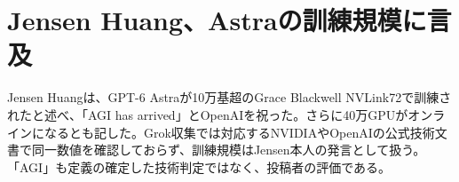 \section{Jensen Huang、Astraの訓練規模に言及}
Jensen Huangは、GPT-6 Astraが10万基超のGrace Blackwell NVLink72で訓練されたと述べ、「AGI has arrived」とOpenAIを祝った。さらに40万GPUがオンラインになるとも記した。Grok収集では対応するNVIDIAやOpenAIの公式技術文書で同一数値を確認しておらず、訓練規模はJensen本人の発言として扱う。「AGI」も定義の確定した技術判定ではなく、投稿者の評価である。
